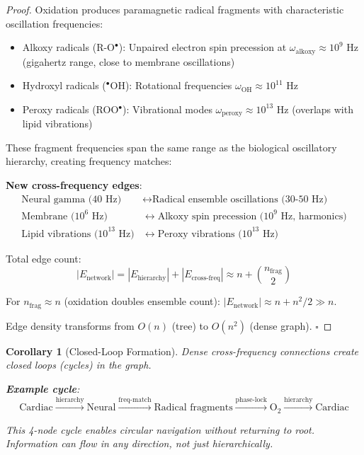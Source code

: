 \documentclass[11pt,a4paper]{article}
\newtheorem{corollary}[theorem]{Corollary}
\theoremstyle{definition}
\theoremstyle{remark}
\begin{document}
\begin{proof}
Oxidation produces paramagnetic radical fragments with characteristic oscillation frequencies:
\begin{itemize}
\item Alkoxy radicals (R-O$^\bullet$): Unpaired electron spin precession at $\omega_{\text{alkoxy}} \approx 10^9$ Hz (gigahertz range, close to membrane oscillations)
\item Hydroxyl radicals ($^\bullet$OH): Rotational frequencies $\omega_{\text{OH}} \approx 10^{11}$ Hz
\item Peroxy radicals (ROO$^\bullet$): Vibrational modes $\omega_{\text{peroxy}} \approx 10^{13}$ Hz (overlaps with lipid vibrations)
\end{itemize}

These fragment frequencies span the same range as the biological oscillatory hierarchy, creating frequency matches:

\textbf{New cross-frequency edges}:
\begin{align}
\text{Neural gamma (40 Hz)} &\leftrightarrow \text{Radical ensemble oscillations (30-50 Hz)} \\
\text{Membrane (10}^6 \text{ Hz)} &\leftrightarrow \text{Alkoxy spin precession (10}^9 \text{ Hz, harmonics)} \\
\text{Lipid vibrations (10}^{13} \text{ Hz)} &\leftrightarrow \text{Peroxy vibrations (10}^{13} \text{ Hz)}
\end{align}

Total edge count:
\begin{equation}
|E_{\text{network}}| = |E_{\text{hierarchy}}| + |E_{\text{cross-freq}}| \approx n + \binom{n_{\text{frag}}}{2}
\end{equation}

For $n_{\text{frag}} \approx n$ (oxidation doubles ensemble count): $|E_{\text{network}}| \approx n + n^2/2 \gg n$.

Edge density transforms from $O(n)$ (tree) to $O(n^2)$ (dense graph). $\square$
\end{proof}

\begin{corollary}[Closed-Loop Formation]
Dense cross-frequency connections create closed loops (cycles) in the graph.

\textbf{Example cycle}:
\begin{equation}
\text{Cardiac} \xrightarrow{\text{hierarchy}} \text{Neural} \xrightarrow{\text{freq-match}} \text{Radical fragments} \xrightarrow{\text{phase-lock}} \text{O}_2 \xrightarrow{\text{hierarchy}} \text{Cardiac}
\end{equation}

This 4-node cycle enables circular navigation without returning to root. Information can flow in any direction, not just hierarchically.
\end{corollary}
\end{document}
